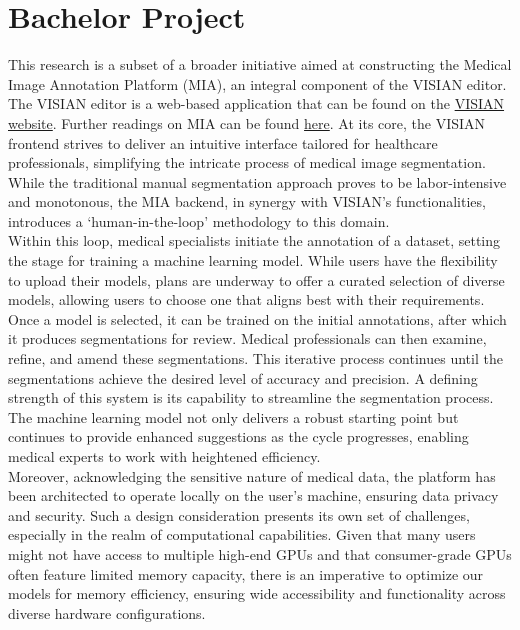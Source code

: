 \section{Bachelor Project}
This research is a subset of a broader initiative aimed at constructing the Medical Image Annotation Platform (MIA), an integral component of the VISIAN editor.
The VISIAN editor is a web-based application that can be found on the \href{https://visian.org/}{VISIAN website}. Further readings on MIA can be found \href{https://mia-ai.vercel.app/}{here}.
At its core, the VISIAN frontend strives to deliver an intuitive interface tailored for healthcare professionals, simplifying the intricate process of medical image segmentation.
While the traditional manual segmentation approach proves to be labor-intensive and monotonous, the MIA backend, in synergy with VISIAN's functionalities,
introduces a `human-in-the-loop' methodology to this domain.\\[1ex]
Within this loop, medical specialists initiate the annotation of a dataset, setting the stage for training a machine learning model. While users have the flexibility to upload their models,
plans are underway to offer a curated selection of diverse models, allowing users to choose one that aligns best with their requirements. Once a model is selected, it can be trained on the initial annotations,
after which it produces segmentations for review. Medical professionals can then examine, refine, and amend these segmentations.
This iterative process continues until the segmentations achieve the desired level of accuracy and precision. A defining strength of this system is its capability to streamline the segmentation process.
The machine learning model not only delivers a robust starting point but continues to provide enhanced suggestions as the cycle progresses, enabling medical experts to work with heightened efficiency.\\[1ex]
Moreover, acknowledging the sensitive nature of medical data, the platform has been architected to operate locally on the user's machine, ensuring data privacy and security.
Such a design consideration presents its own set of challenges, especially in the realm of computational capabilities.
Given that many users might not have access to multiple high-end GPUs and that consumer-grade GPUs often feature limited memory capacity, there is an imperative to optimize our models for memory efficiency,
ensuring wide accessibility and functionality across diverse hardware configurations.

